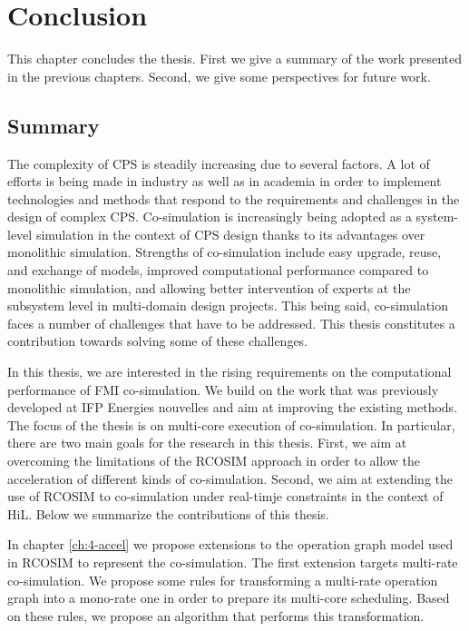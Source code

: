 \chapter{\label{ch:7-concl}Conclusion} 

\minitoc

This chapter concludes the thesis. First we give a summary of the work presented in the previous chapters. Second, we give some perspectives for future work.

\section{Summary}

The complexity of CPS is steadily increasing due to several factors. A lot of efforts is being made in industry as well as in academia in order to implement technologies and methods that respond to the requirements and challenges in the design of complex CPS. Co-simulation is increasingly being adopted as a system-level simulation in the context of CPS design thanks to its advantages over monolithic simulation. Strengths of co-simulation include easy upgrade, reuse, and exchange of models, improved computational performance compared to monolithic simulation, and allowing better intervention of experts at the subsystem level in multi-domain design projects. This being said, co-simulation faces a number of challenges that have to be addressed. This thesis constitutes a contribution towards solving some of these challenges.   

In this thesis, we are interested in the rising requirements on the computational performance of FMI co-simulation. We build on the work that was previously developed at IFP Energies nouvelles and aim at improving the existing methods. The focus of the thesis is on multi-core execution of co-simulation. In particular, there are two main goals for the research in this thesis. First, we aim at overcoming the limitations of the RCOSIM approach in order to allow the acceleration of different kinds of co-simulation. Second, we aim at extending the use of RCOSIM to co-simulation under real-timje constraints in the context of HiL. Below we summarize the contributions of this thesis.

In chapter \ref{ch:4-accel} we propose extensions to the operation graph model used in RCOSIM to represent the co-simulation. The first extension targets multi-rate co-simulation. We propose some rules for transforming a multi-rate operation graph into a mono-rate one in order to prepare its multi-core scheduling. Based on these rules, we propose an algorithm that performs this transformation.

